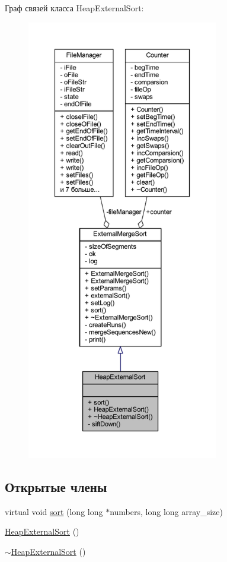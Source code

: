 Граф связей класса Heap\+External\+Sort\+:\nopagebreak
\begin{figure}[H]
\begin{center}
\leavevmode
\includegraphics[height=550pt]{class_heap_external_sort__coll__graph}
\end{center}
\end{figure}
\subsection*{Открытые члены}
\begin{DoxyCompactItemize}
\item 
virtual void \hyperlink{class_heap_external_sort_a908087ce13932b268a35e1184a05ea44}{sort} (long long $\ast$numbers, long long array\+\_\+size)
\item 
\hyperlink{class_heap_external_sort_a9e6236e47430f0b530b287a6d7cf3a8b}{Heap\+External\+Sort} ()
\item 
\hyperlink{class_heap_external_sort_afa76473510a8cb610bb94bca5b5202c9}{$\sim$\+Heap\+External\+Sort} ()
\end{DoxyCompactItemize}
